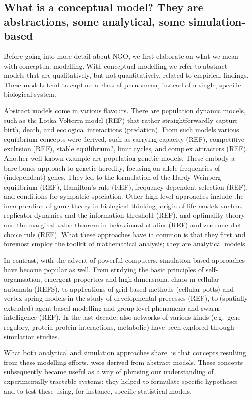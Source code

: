 \subsection{What is a conceptual model? They are abstractions, some analytical, some simulation-based}

Before going into more detail about NGO, we first elaborate on what we mean with conceptual modelling. With conceptual modelling we refer to abstract models that are qualitatively, but not quantitatively, related to empirical findings. These models tend to capture a class of phenomena, instead of a single, specific biological system.

Abstract models come in various flavours. There are population dynamic models, such as the Lotka-Volterra model (REF) that rather straightforwardly capture birth, death, and ecological interactions (predation). From such models various equilibrium concepts were derived, such as carrying capacity (REF), competitive exclusion (REF), stable equilibrium?, limit cycles, and complex attractors (REF). Another well-known example are population genetic models. These embody a bare-bones approach to genetic heredity, focusing on allele frequencies of (independent) genes. They led to the formulation of the Hardy-Weinberg equilibrium (REF), Hamilton’s rule (REF), frequency-dependent selection (REF), and conditions for sympatric speciation. Other high-level approaches include the incorporation of game theory in biological thinking, origin of life models such as replicator dynamics and the information threshold (REF), and optimality theory and the marginal value theorem in behavioural studies (REF) and zero-one diet choice rule (REF). What these approaches have in common is that they first and foremost employ the toolkit of mathematical analysis; they are analytical models.

In contrast, with the advent of powerful computers, simulation-based approaches have become popular as well. From studying the basic principles of self-organisation, emergent properties and high-dimensional chaos in cellular automata (REFS), to applications of grid-based methods (cellular-potts) and vertex-spring models in the study of developmental processes (REF), to (spatially extended) agent-based modelling and group-level phenomena and swarm intelligence (REF). In the last decade, also networks of various kinds (e.g.\ gene regulory, protein-protein interactions, metabolic) have been explored through simulation studies.

What both analytical and simulation approaches share, is that concepts resulting from these modelling efforts, were derived from abstract models. These concepts subsequently became useful as a way of phrasing our understanding of experimentally tractable systems: they helped to formulate specific hypotheses and to test these using, for instance, specific statistical models.
  